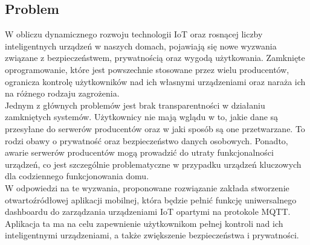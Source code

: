 \newpage

\subsection{Problem}
W obliczu dynamicznego rozwoju technologii IoT oraz rosnącej liczby inteligentnych urządzeń w naszych domach, pojawiają się nowe wyzwania związane z bezpieczeństwem, prywatnością oraz wygodą użytkowania. Zamknięte oprogramowanie, które jest powszechnie stosowane przez wielu producentów, ogranicza kontrolę użytkowników nad ich własnymi urządzeniami oraz naraża ich na różnego rodzaju zagrożenia.\\

Jednym z głównych problemów jest brak transparentności w działaniu zamkniętych systemów. Użytkownicy nie mają wglądu w to, jakie dane są przesyłane do serwerów producentów oraz w jaki sposób są one przetwarzane. To rodzi obawy o prywatność oraz bezpieczeństwo danych osobowych. Ponadto, awarie serwerów producentów mogą prowadzić do utraty funkcjonalności urządzeń, co jest szczególnie problematyczne w przypadku urządzeń kluczowych dla codziennego funkcjonowania domu.\\

W odpowiedzi na te wyzwania, proponowane rozwiązanie zakłada stworzenie otwartoźródłowej aplikacji mobilnej, która będzie pełnić funkcję uniwersalnego dashboardu do zarządzania urządzeniami IoT opartymi na protokole MQTT. Aplikacja ta ma na celu zapewnienie użytkownikom pełnej kontroli nad ich inteligentnymi urządzeniami, a także zwiększenie bezpieczeństwa i prywatności.